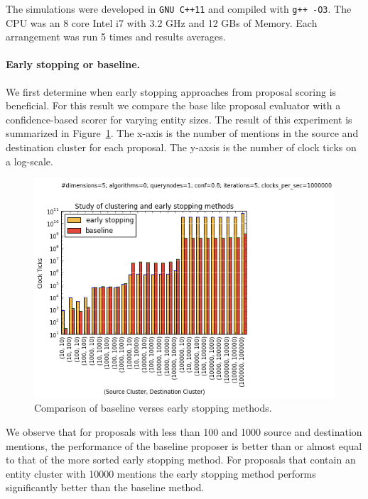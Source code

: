 The simulations were developed in \texttt{GNU C++11} and compiled with \texttt{g++ -O3}. 
The CPU was an 8 core Intel i7 with 3.2 GHz and 12 GBs of Memory.
Each arrangement was run 5 times and results averages.



\paragraph{Early stopping or baseline.}
We first determine when early stopping approaches from proposal scoring is beneficial.
For this result we compare the base like proposal evaluator with a confidence-based scorer for varying entity sizes.
The result of this experiment is summarized in Figure~\ref{fig:clustering-v-early-stopping}.
The x-axis is the number of mentions in the source and destination cluster for each proposal. 
The y-axsis is the number of clock ticks on a log-scale.

\begin{figure}
\centering
\includegraphics[width=\columnwidth, clip=true,trim=0cm 0cm 4cm 1.2cm]{media/clustering-v-early-stopping.png}
\caption{Comparison of baseline verses early stopping methods.}
\label{fig:clustering-v-early-stopping}
\end{figure}

We observe that for proposals with less than 100 and 1000 source and
destination mentions, the performance of the baseline proposer is better than
or almost equal to that of the more sorted early stopping method.
For proposals that contain an entity cluster with 10000 mentions
the early stopping method performs significantly better than the baseline method.

